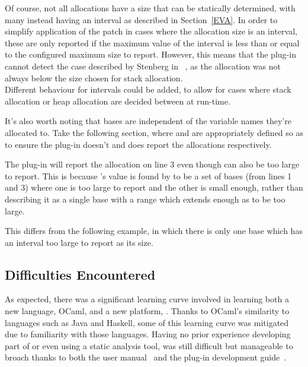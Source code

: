 Of course, not all allocations have a size that can be statically determined, with many instead having an interval as described in Section~\ref{EVA}. In order to simplify application of the patch in cases where the allocation size is an interval, these are only reported if the maximum value of the interval is less than or equal to the configured maximum size to report. However, this means that the plug-in cannot detect the case described by Stenberg in ~\cite{curlmalloc}, as the allocation was not always below the size chosen for stack allocation.\\
Different behaviour for intervals could be added, to allow for cases where stack allocation or heap allocation are decided between at run-time.

It's also worth noting that bases are independent of the variable names they're allocated to. Take the following section, where  and  are appropriately defined so as to ensure the plug-in doesn't and does report the allocations respectively.



The plug-in will report the allocation on line 3 even though  can also be too large to report. This is because 's value is found by  to be a set of bases (from lines 1 and 3) where one is too large to report and the other is small enough, rather than describing it as a single base with a range which extends enough as to be too large.

This differs from the following example, in which there is only one base which has an interval too large to report as its size.



\subsection{Difficulties Encountered}


As expected, there was a significant learning curve involved in learning both a new language, OCaml, and a new platform, . Thanks to OCaml's similarity to languages such as Java and Haskell, some of this learning curve was mitigated due to familiarity with those languages. Having no prior experience developing part of or even using a static analysis tool,  was still difficult but manageable to broach thanks to both the user manual~\cite{framauser} and the plug-in development guide~\cite{framaplug}.

